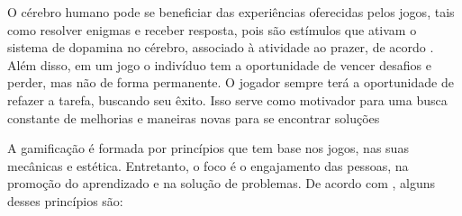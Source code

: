 \documentclass[12pt]{article}
\begin{document}
O cérebro humano pode se beneficiar das experiências oferecidas pelos jogos, tais como resolver enigmas e receber resposta, pois são estímulos que ativam o sistema de dopamina no cérebro, associado à atividade ao prazer, de acordo \cite{clementi2014diretrizes}. Além disso, em um jogo o indivíduo tem a oportunidade de vencer desafios e perder, mas não de forma permanente. O jogador sempre terá a oportunidade de refazer a tarefa, buscando seu êxito. Isso serve como motivador para uma busca constante de melhorias e maneiras novas para se encontrar soluções \cite{busarello2016gamification}

A gamificação é formada por princípios que tem base nos jogos, nas suas mecânicas e estética. Entretanto, o foco é o engajamento das pessoas, na promoção do aprendizado e na solução de problemas. De acordo com \cite{ludospro}, alguns desses princípios são:
\end{document}
